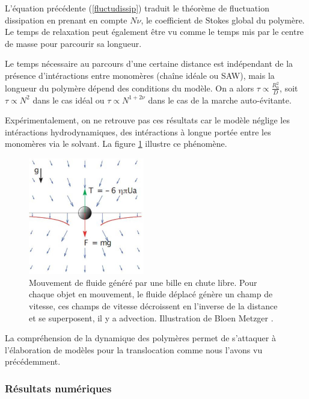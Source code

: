 \documentclass[a4paper,11pt]{article}
\begin{document}
L'équation précédente (\ref{fluctudissip}) traduit le théorème de fluctuation dissipation  en prenant en compte $N \nu$, le coefficient de Stokes global du polymère. Le temps de relaxation peut également être vu comme le temps mis par le centre de masse pour parcourir sa longueur.

 Le temps nécessaire au parcours d'une certaine distance est indépendant de la présence d'intéractions entre monomères (chaîne idéale ou SAW), mais la longueur du polymère dépend des conditions du modèle. On a alors $\tau \propto \frac{R_0^2}{D}$, soit $\tau \propto N^2 $ dans le cas idéal ou $\tau \propto N^{1+2\nu} $ dans le cas de la marche auto-évitante. 

Expérimentalement, on ne retrouve pas ces résultats car le modèle néglige les intéractions hydrodynamiques, des intéractions à longue portée entre les monomères via le solvant. La figure \ref{hydrodyninterac} illustre ce phénomène.


\begin{figure}[H]
\begin{center}
\includegraphics[width=0.45\textwidth]{hydrodyninterac.jpg} 

\caption{Mouvement de fluide généré par une bille en chute libre. Pour chaque objet en mouvement, le fluide déplacé génère un champ de vitesse, ces champs de vitesse décroissent en l'inverse de la distance et se superposent, il y a advection. Illustration de Bloen Metzger \cite{bloen}.}
\label{hydrodyninterac}
\end{center}
\end{figure}

La compréhension de la dynamique des polymères permet de s'attaquer à l'élaboration de modèles pour la translocation comme nous l'avons vu précédemment.


\subsubsection*{Résultats numériques}
\end{document}

